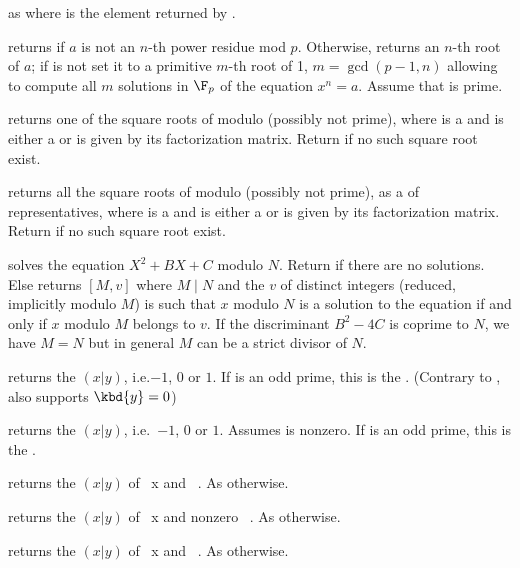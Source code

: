 as  where  is the element returned by
.

returns  if $a$ is not an $n$-th power residue mod $p$.
Otherwise, returns an $n$-th root of $a$; if  is not 
set it to a primitive $m$-th root of 1, $m = \gcd(p-1,n)$ allowing to compute
all $m$ solutions in $\F_p$ of the equation $x^n = a$.
Assume that  is prime.

 returns one of the square roots of 
modulo  (possibly not prime), where  is a  and 
is either a  or is given by its factorization matrix.  Return
 if no such square root exist.

 returns all the square roots of 
modulo  (possibly not prime), as a  of representatives,
 where  is a  and  is either a  or is given by
its factorization matrix.  Return  if no such square root exist.

 solves the equation $X^2 + B X
+ C$ modulo $N$. Return  if there are no solutions. Else returns
 $[M, v]$ where $M \mid N$ and the  $v$ of distinct integers
(reduced, implicitly modulo $M$) is such that $x$ modulo $N$ is a solution to
the equation if and only if $x$ modulo $M$ belongs to $v$. If the
discriminant $B^2-4C$ is coprime to $N$, we have $M = N$ but in general $M$
can be a strict divisor of $N$.

 returns the  $(x|y)$,
i.e.$-1$, $0$ or $1$. If  is an odd prime, this is the . (Contrary to ,  also supports $\kbd{y} = 0$)

 returns the 
$(x|y)$, i.e.~$-1$, $0$ or $1$. Assumes  is nonzero. If  is an
odd prime, this is the .

 returns the  $(x|y)$
of ~x and ~. As  otherwise.

 returns the  $(x|y)$
of ~x and nonzero ~. As  otherwise.

 returns the  $(x|y)$
of ~x and ~. As  otherwise.

